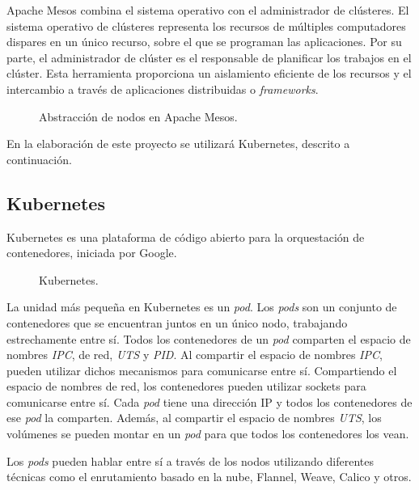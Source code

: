 Apache Mesos combina el sistema operativo con el administrador de clústeres. El sistema operativo de clústeres representa los recursos de múltiples computadores dispares en un único recurso, sobre el que se programan las aplicaciones. Por su parte, el administrador de clúster es el responsable de planificar los trabajos en el clúster. Esta herramienta proporciona un aislamiento eficiente de los recursos y el intercambio a través de aplicaciones distribuidas o \textit{frameworks}.

\begin{figure}[H]
\caption{Abstracción de nodos en Apache Mesos.\label{fig:figure_placement_example}}
\end{figure}

En la elaboración de este proyecto se utilizará Kubernetes, descrito a continuación.	

\subsection{Kubernetes}

Kubernetes es una plataforma de código abierto para la orquestación de contenedores, iniciada por Google.

\begin{figure}[H]
\caption{Kubernetes.\label{fig:figure_placement_example}}
\end{figure}

La unidad más pequeña en Kubernetes es un \textit{pod}. Los \textit{pods} son un conjunto de contenedores que se encuentran juntos en un único nodo, trabajando estrechamente entre sí. Todos los contenedores de un \textit{pod} comparten el espacio de nombres \textit{IPC}, de red, \textit{UTS} y \textit{PID}. Al compartir el espacio de nombres \textit{IPC}, pueden utilizar dichos mecanismos para comunicarse entre sí. Compartiendo el espacio de nombres de red, los contenedores pueden utilizar sockets para comunicarse entre sí. Cada \textit{pod} tiene una dirección IP y todos los contenedores de ese \textit{pod} la comparten. Además, al compartir el espacio de nombres \textit{UTS}, los volúmenes se pueden montar en un \textit{pod} para que todos los contenedores los vean.

Los \textit{pods} pueden hablar entre sí a través de los nodos utilizando diferentes técnicas como el enrutamiento basado en la nube, Flannel, Weave, Calico y otros.

